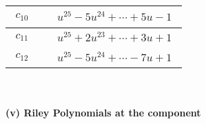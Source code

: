 \documentclass[1p]{elsarticle_modified}
\theoremstyle{definition}
\begin{document}
\begin{tabular}{m{50pt}|m{274pt}}
\hline $$\begin{aligned}c_{10}\end{aligned}$$&$\begin{aligned}
&u^{25}-5 u^{24}+\cdots+5 u-1
\end{aligned}$\\
\hline $$\begin{aligned}c_{11}\end{aligned}$$&$\begin{aligned}
&u^{25}+2 u^{23}+\cdots+3 u+1
\end{aligned}$\\
\hline $$\begin{aligned}c_{12}\end{aligned}$$&$\begin{aligned}
&u^{25}-5 u^{24}+\cdots-7 u+1
\end{aligned}$\\
\hline
\end{tabular}\\~\\
\newpage\renewcommand{\arraystretch}{1}
\flushleft \textbf{(v) Riley Polynomials at the component}\newline \\
\end{document}
